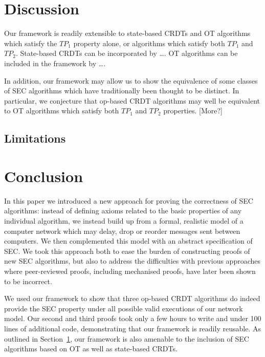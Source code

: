 \documentclass[acmlarge,review,anonymous]{acmart}\settopmatter{printfolios=true}
\begin{document}








\section{Discussion}
\label{sect.discussion}

Our framework is readily extensible to state-based CRDTs and OT algorithms which satisfy the $\mathit{TP}_1$  property alone, or algorithms which satisfy both $\mathit{TP}_1$ and $\mathit{TP}_2$. State-based CRDTs can be incorporated by \ldots. OT algorithms can be included in the framework by \ldots.

In addition, our framework may allow us to show the equivalence of some classes of SEC algorithms which have traditionally been thought to be distinct. In particular, we conjecture that op-based CRDT algorithms may well be equivalent to OT algorithms which satisfy both $\mathit{TP}_1$ and $\mathit{TP}_2$ properties. [More?]

\subsection{Limitations}
\label{sect.limitations}

\section{Conclusion}
\label{sect.conclusion}

In this paper we introduced a new approach for proving the correctness of SEC algorithms: instead of defining axioms related to the basic properties of any individual algorithm, we instead build up from a formal, realistic model of a computer network which may delay, drop or reorder messages sent between computers. We then complemented this model with an abstract specification of SEC. We took this approach both to ease the burden of constructing proofs of new SEC algorithms, but also to address the difficulties with previous approaches where peer-reviewed proofs, including mechanised proofs, have later been shown to be incorrect.

We used our framework to show that three op-based CRDT algorithms do indeed provide the SEC property under all possible valid executions of our network model. Our second and third proofs took only a few hours to write and under 100 lines of additional code, demonstrating that our framework is readily reusable. As outlined in Section~\ref{sect.discussion}, our framework is also amenable to the inclusion of SEC algorithms based on OT as well as state-based CRDTs.
\end{document}

